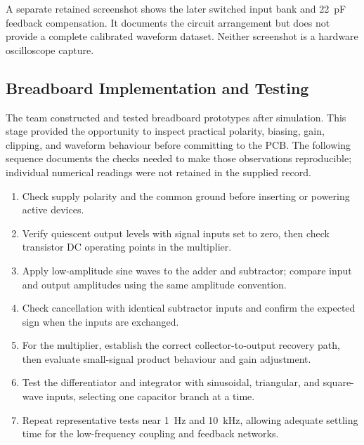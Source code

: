 \documentclass[11pt,a4paper]{article}
\begin{document}
A separate retained screenshot shows the later switched input bank and 22~pF feedback compensation. It documents the circuit arrangement but does not provide a complete calibrated waveform dataset. Neither screenshot is a hardware oscilloscope capture.


\subsection{Breadboard Implementation and Testing}
The team constructed and tested breadboard prototypes after simulation. This stage provided the opportunity to inspect practical polarity, biasing, gain, clipping, and waveform behaviour before committing to the PCB. The following sequence documents the checks needed to make those observations reproducible; individual numerical readings were not retained in the supplied record.

\begin{enumerate}
\item Check supply polarity and the common ground before inserting or powering active devices.
\item Verify quiescent output levels with signal inputs set to zero, then check transistor DC operating points in the multiplier.
\item Apply low-amplitude sine waves to the adder and subtractor; compare input and output amplitudes using the same amplitude convention.
\item Check cancellation with identical subtractor inputs and confirm the expected sign when the inputs are exchanged.
\item For the multiplier, establish the correct collector-to-output recovery path, then evaluate small-signal product behaviour and gain adjustment.
\item Test the differentiator and integrator with sinusoidal, triangular, and square-wave inputs, selecting one capacitor branch at a time.
\item Repeat representative tests near 1~Hz and 10~kHz, allowing adequate settling time for the low-frequency coupling and feedback networks.
\end{enumerate}
\end{document}
